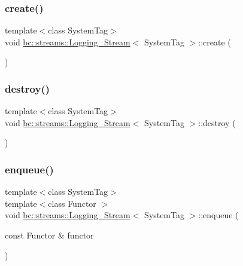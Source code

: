 \subsubsection{\texorpdfstring{create()}{create()}}
{\footnotesize\ttfamily template$<$class System\+Tag$>$ \\
void \hyperlink{structbc_1_1streams_1_1Logging__Stream}{bc\+::streams\+::\+Logging\+\_\+\+Stream}$<$ System\+Tag $>$\+::create (\begin{DoxyParamCaption}{ }\end{DoxyParamCaption})\hspace{0.3cm}{\ttfamily [inline]}}

\mbox{\label{structbc_1_1streams_1_1Logging__Stream_a74ed4c6a60bf32c125c212d2fb07de10}} 
\subsubsection{\texorpdfstring{destroy()}{destroy()}}
{\footnotesize\ttfamily template$<$class System\+Tag$>$ \\
void \hyperlink{structbc_1_1streams_1_1Logging__Stream}{bc\+::streams\+::\+Logging\+\_\+\+Stream}$<$ System\+Tag $>$\+::destroy (\begin{DoxyParamCaption}{ }\end{DoxyParamCaption})\hspace{0.3cm}{\ttfamily [inline]}}

\mbox{\label{structbc_1_1streams_1_1Logging__Stream_a02f3be7b4c71e932a6b948680bf22f35}} 
\subsubsection{\texorpdfstring{enqueue()}{enqueue()}}
{\footnotesize\ttfamily template$<$class System\+Tag$>$ \\
template$<$class Functor $>$ \\
void \hyperlink{structbc_1_1streams_1_1Logging__Stream}{bc\+::streams\+::\+Logging\+\_\+\+Stream}$<$ System\+Tag $>$\+::enqueue (\begin{DoxyParamCaption}\item[{const Functor \&}]{functor }\end{DoxyParamCaption})\hspace{0.3cm}{\ttfamily [inline]}}

